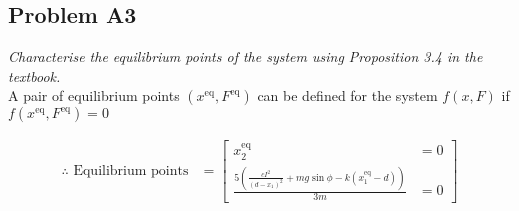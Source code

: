\subsection*{Problem A3} \emph{Characterise the equilibrium points of the system using Proposition 3.4 in the textbook.}\\
    A pair of equilibrium points $({x^\text{eq}}, {F^\text{eq}})$ can be defined for the system $f(x, F)$ if $f({x^\text{eq}}, {F^\text{eq}}) = 0$
    
    \begin{align}
        {\therefore} \text{ Equilibrium points} &=
        \begin{bmatrix}
            {x_2^\text{eq}} &= 0
            \\
            \frac{5(\frac{c I^2}{(d - {x_1})^2} + mg \sin{\phi} - k({x_1^\text{eq}} -d))}{3m} &= 0
        \end{bmatrix}
    \end{align}
    